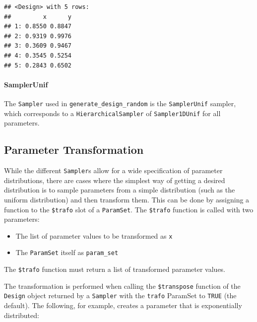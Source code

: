 \documentclass[]{scrbook}
\newenvironment{Shaded}{\begin{snugshade}}{\end{snugshade}}
\newcommand{\ControlFlowTok}[1]{\textcolor[rgb]{0.13,0.29,0.53}{\textbf{#1}}}
\newcommand{\DecValTok}[1]{\textcolor[rgb]{0.00,0.00,0.81}{#1}}
\newcommand{\KeywordTok}[1]{\textcolor[rgb]{0.13,0.29,0.53}{\textbf{#1}}}
\newcommand{\NormalTok}[1]{#1}
\newcommand{\OperatorTok}[1]{\textcolor[rgb]{0.81,0.36,0.00}{\textbf{#1}}}
\newcommand{\StringTok}[1]{\textcolor[rgb]{0.31,0.60,0.02}{#1}}
\providecommand{\tightlist}{%
  \setlength{\itemsep}{0pt}\setlength{\parskip}{0pt}}
\let\oldparagraph\paragraph
\renewcommand{\paragraph}[1]{\oldparagraph{#1}\mbox{}}
\renewenvironment{Shaded} {\begin{snugshade}\small} {\end{snugshade}}
\begin{document}
\begin{verbatim}
## <Design> with 5 rows:
##         x      y
## 1: 0.8550 0.8847
## 2: 0.9319 0.9976
## 3: 0.3609 0.9467
## 4: 0.3545 0.5254
## 5: 0.2843 0.6502
\end{verbatim}

\hypertarget{samplerunif}{%
\paragraph{SamplerUnif}\label{samplerunif}}

The \texttt{Sampler} used in \texttt{generate\_design\_random} is the \texttt{SamplerUnif} sampler, which corresponds to a \texttt{HierarchicalSampler} of \texttt{Sampler1DUnif} for all parameters.

\hypertarget{parameter-transformation}{%
\subsection{Parameter Transformation}\label{parameter-transformation}}

While the different \texttt{Sampler}s allow for a wide specification of parameter distributions, there are cases where the simplest way of getting a desired distribution is to sample parameters from a simple distribution (such as the uniform distribution) and then transform them.
This can be done by assigning a function to the \texttt{\$trafo} slot of a \texttt{ParamSet}.
The \texttt{\$trafo} function is called with two parameters:

\begin{itemize}
\tightlist
\item
  The list of parameter values to be transformed as \texttt{x}
\item
  The \texttt{ParamSet} itself as \texttt{param\_set}
\end{itemize}

The \texttt{\$trafo} function must return a list of transformed parameter values.

The transformation is performed when calling the \texttt{\$transpose} function of the \texttt{Design} object returned by a \texttt{Sampler} with the \texttt{trafo} ParamSet to \texttt{TRUE} (the default).
The following, for example, creates a parameter that is exponentially distributed:

\begin{Shaded}
\end{Shaded}
\end{document}
